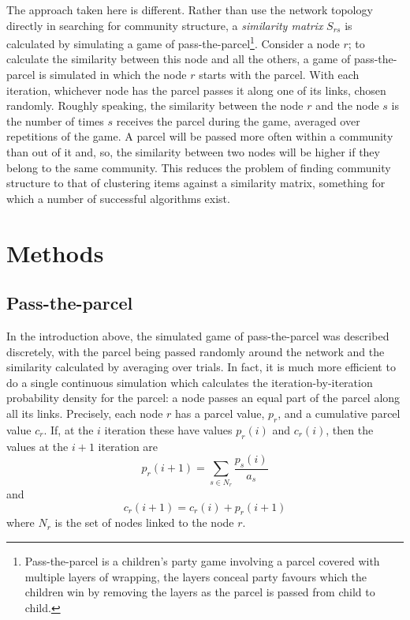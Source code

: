 \documentclass[12pt]{iopart}
\begin{document}
The approach taken here is different. Rather than use the network
topology directly in searching for community structure, a {\sl
  similarity matrix} $S_{rs}$ is calculated by simulating a game of
pass-the-parcel\footnote{Pass-the-parcel is a children's party game
  involving a parcel covered with multiple layers of wrapping, the
  layers conceal party favours which the children win by removing the
  layers as the parcel is passed from child to child.}. Consider a
node $r$; to calculate the similarity between this node and all the
others, a game of pass-the-parcel is simulated in which the node $r$
starts with the parcel. With each iteration, whichever node has the
parcel passes it along one of its links, chosen randomly. Roughly
speaking, the similarity between the node $r$ and the node $s$ is the
number of times $s$ receives the parcel during the game, averaged over
repetitions of the game. A parcel will be passed more often within a
community than out of it and, so, the similarity between two nodes
will be higher if they belong to the same community. This reduces the
problem of finding community structure to that of clustering items
against a similarity matrix, something for which a number of
successful algorithms exist.

\section{Methods}

\subsection*{Pass-the-parcel}

In the introduction above, the simulated game of pass-the-parcel was
described discretely, with the parcel being passed randomly around the
network and the similarity calculated by averaging over trials. In
fact, it is much more efficient to do a single continuous simulation
which calculates the iteration-by-iteration probability density for
the parcel: a node passes an equal part of the parcel along all its
links. Precisely, each node $r$ has a parcel value, $p_r$, and a
cumulative parcel value $c_r$. If, at the $i$ iteration these have
values $p_r(i)$ and $c_r(i)$, then the values at the $i+1$ iteration
are
\begin{equation}
p_r(i+1)=\sum_{s\in N_r}\frac{p_s(i)}{a_s}
\end{equation}
and
\begin{equation}
c_r(i+1)=c_r(i)+p_r(i+1)
\end{equation}
where $N_r$ is the set of nodes linked to the node $r$. 
\end{document}
